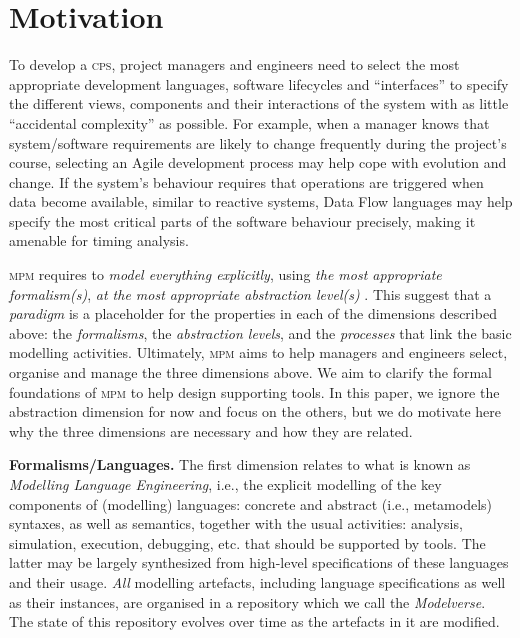 \section{Motivation}
\label{sec:Motivation}

To develop a \textsc{cps}, project managers and engineers need to select the most 
appropriate development languages, software lifecycles and ``interfaces'' to 
specify the different views, components and their interactions of the system 
with as little ``accidental complexity''  \cite{BrooksSilverBullet} as possible. 
For example, when a manager knows that system/software 
requirements are likely to change frequently during the project's course, 
selecting an Agile development process may help cope with evolution and 
change. If the system's behaviour requires that operations are triggered when 
data become available, similar to reactive systems, Data Flow 
languages may help specify the most critical parts of the software behaviour precisely, 
making it amenable for timing analysis. 

\textsc{mpm} requires to \emph{model everything explicitly}, using \emph{the 
most appropriate formalism(s)}, \emph{at the most appropriate abstraction level(s)} 
\cite{PhD:VanTandeloo:2017}. This suggest that a \emph{paradigm} is a 
placeholder for the properties in each of the dimensions described 
above: the \emph{formalisms}, the \emph{abstraction levels}, and the 
\emph{processes} that link the basic modelling activities. 
Ultimately, \textsc{mpm} aims to help managers and engineers select, organise and manage the 
three dimensions above. We aim to clarify the formal foundations of 
\textsc{mpm} to help design supporting tools. In this paper, we ignore the abstraction dimension 
for now and focus on the others, but we do motivate here why the three dimensions are necessary and 
how they are related.

\noindent
\textbf{Formalisms/Languages.} The first dimension relates to what is  
known as \emph{Modelling Language Engineering}, i.e., the explicit modelling of 
the key components of (modelling) languages: concrete and abstract (i.e., 
metamodels) syntaxes, as well as semantics, together with the usual activities: 
analysis, simulation, execution, debugging, etc. that should be 
supported by tools. The latter may be largely synthesized from high-level 
specifications of these languages and their usage. \emph{All} modelling artefacts, including 
language specifications as well as their instances, are 
organised in a repository which we call the \emph{Modelverse}.
The state of this repository evolves over time as the artefacts in it are modified.

